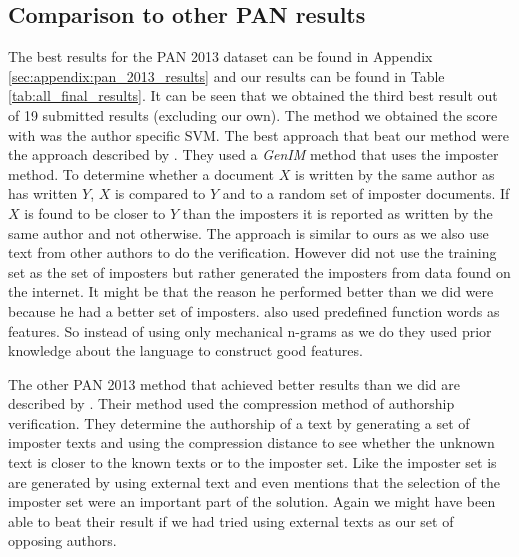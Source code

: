 \subsection{Comparison to other PAN results}
The best results for the PAN 2013 dataset can be found in Appendix
\ref{sec:appendix:pan_2013_results} and our results can be found in Table
\ref{tab:all_final_results}. It can be seen that we obtained the third best
result out of 19 submitted results (excluding our own). The method we obtained
the score with was the author specific SVM. The best approach that beat
our method were the approach described by \cite{seidman:2013}. They used a
\textit{GenIM} method that uses the imposter method. To determine whether a
document $X$ is written by the same author as has written $Y$, $X$ is compared
to $Y$ and to a random set of imposter documents. If $X$ is found to be closer
to $Y$ than the imposters it is reported as written by the same author and
not otherwise. The approach is similar to ours as we also use text from other
authors to do the verification. However \cite{seidman:2013} did not use the
training set as the set of imposters but rather generated the imposters from
data found on the internet. It might be that the reason he performed better than
we did were because he had a better set of imposters. \cite{seidman:2013} also
used predefined function words as features. So instead of using only mechanical
n-grams as we do they used prior knowledge about the language to construct good
features.

The other PAN 2013 method that achieved better results than we did are described
by \cite{veenman:2013}. Their method used the compression method of authorship
verification. They determine the authorship of a text by generating a set of
imposter texts and using the compression distance to see whether the unknown
text is closer to the known texts or to the imposter set. Like
\cite{seidman:2013} the imposter set is are generated by using external text and
\cite{veenman:2013} even mentions that the selection of the imposter set were an
important part of the solution. Again we might have been able to beat their
result if we had tried using external texts as our set of opposing authors.

